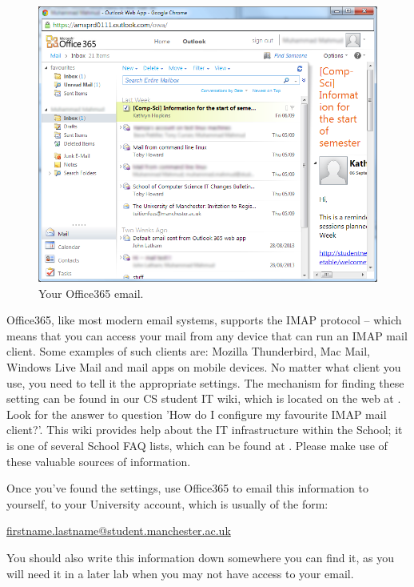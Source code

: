 \begin{figure}
\centerline{\includegraphics[width=15cm]{images/hamza-365-mail.png}}
\caption{Your Office365 email.}
\label{figure:welc-mail365}
\end{figure}

\label{sec:reading-your-mail}

Office365, like most modern email systems, supports the IMAP
protocol -- which means that you can access your mail from any device
that can run an IMAP mail client. Some examples of such clients are:
Mozilla Thunderbird, Mac Mail, Windows Live Mail and mail apps on mobile devices. No matter what
client you use, you need to tell it the appropriate settings. The mechanism for finding these setting can be found in our CS student IT wiki, which is located on the web at . Look for the answer to question 'How do I configure my favourite IMAP mail client?'. This wiki provides help about the IT infrastructure within the School; it is one of several School FAQ lists, which can be found at . Please make use of these valuable sources of information.

Once you've found the settings, use Office365 to email this information to yourself, to your
University account, which is usually of the form:

\url{firstname.lastname@student.manchester.ac.uk}

You should also write this information down somewhere you can find it, as you will need it in a later lab when you may not have access to your email.

